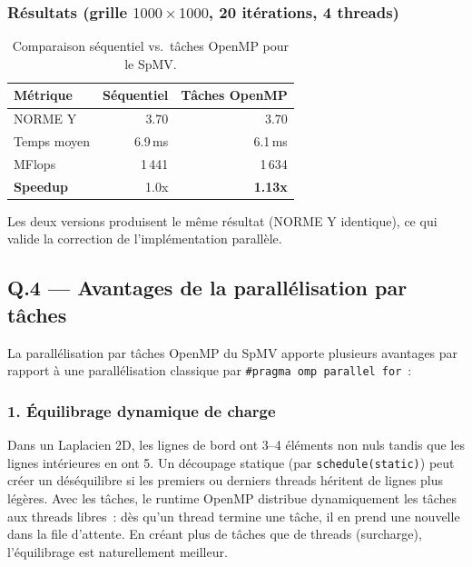 \documentclass[12pt,a4paper]{article}
\begin{document}
\subsubsection{Résultats (grille $1000 \times 1000$, 20 itérations, 4 threads)}

\begin{table}[h]
\centering
\begin{tabular}{lrr}
\toprule
\textbf{Métrique} & \textbf{Séquentiel} & \textbf{Tâches OpenMP} \\
\midrule
NORME Y               & 3.70       & 3.70 \\
Temps moyen            & 6.9\,ms    & 6.1\,ms \\
MFlops                 & 1\,441     & 1\,634 \\
\textbf{Speedup}       & 1.0x       & \textbf{1.13x} \\
\bottomrule
\end{tabular}
\caption{Comparaison séquentiel vs.\ tâches OpenMP pour le SpMV.}
\end{table}

Les deux versions produisent le même résultat (NORME Y identique), ce qui valide la correction de l'implémentation parallèle.

\subsection{Q.4 --- Avantages de la parallélisation par tâches}

La parallélisation par tâches OpenMP du SpMV apporte plusieurs avantages par rapport à une parallélisation classique par \texttt{\#pragma omp parallel for}~:

\subsubsection{1. Équilibrage dynamique de charge}

Dans un Laplacien 2D, les lignes de bord ont 3--4 éléments non nuls tandis que les lignes intérieures en ont 5. Un découpage statique (par \texttt{schedule(static)}) peut créer un déséquilibre si les premiers ou derniers threads héritent de lignes plus légères. Avec les tâches, le runtime OpenMP distribue dynamiquement les tâches aux threads libres~: dès qu'un thread termine une tâche, il en prend une nouvelle dans la file d'attente. En créant plus de tâches que de threads (surcharge), l'équilibrage est naturellement meilleur.
\end{document}
